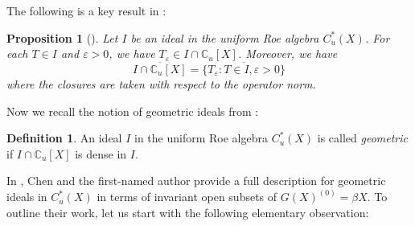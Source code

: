 \documentclass[12pt, a4paper]{amsart}
\numberwithin{equation}{section}
\newtheorem{prop}[thm]{Proposition}
\theoremstyle{definition}
\newtheorem{defn}[thm]{Definition}
\theoremstyle{remark}
\def\CC{\mathbb{C}}
\def\supp{\mathrm{supp}}
\begin{document}
%


The following is a key result in \cite{CW04}:

\begin{prop}[{\cite[Theorem 3.5]{CW04}}]\label{prop: Thm 3.5 in CW04}
Let $I$ be an ideal in the uniform Roe algebra $C^*_u(X)$. For each $T \in I$ and $\varepsilon>0$, we have $T_\varepsilon \in I \cap \CC_u[X]$. Moreover, we have
\[
\overline{I \cap \CC_u[X]} = \overline{\{T_\varepsilon: T \in I, \varepsilon>0\}}
\]
where the closures are taken with respect to the operator norm.
\end{prop}

Now we recall the notion of geometric ideals from \cite{Wan07}:

\begin{defn}\label{defn: geometric ideals}
An ideal $I$ in the uniform Roe algebra $C^*_u(X)$ is called \emph{geometric} if $I \cap \CC_u[X]$ is dense in $I$.
\end{defn}

In \cite{CW04}, Chen and the first-named author provide a full description for geometric ideals in $C^*_u(X)$ in terms of invariant open subsets of $G(X)^{(0)}=\beta X$.
To outline their work, let us start with the following elementary observation:

\end{document}
